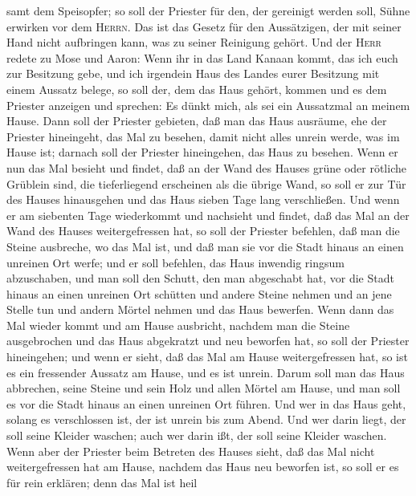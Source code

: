 samt dem Speisopfer; so soll der Priester für den, der gereinigt werden
soll, Sühne erwirken vor dem \textsc{Herrn}.  Das ist das
Gesetz für den Aussätzigen, der mit seiner Hand nicht aufbringen kann,
was zu seiner Reinigung gehört.  Und der \textsc{Herr}
redete zu Mose und Aaron:  Wenn ihr in das Land Kanaan
kommt, das ich euch zur Besitzung gebe, und ich irgendein Haus des
Landes eurer Besitzung mit einem Aussatz belege,  so soll
der, dem das Haus gehört, kommen und es dem Priester anzeigen und
sprechen: Es dünkt mich, als sei ein Aussatzmal an meinem Hause.
 Dann soll der Priester gebieten, daß man das Haus
ausräume, ehe der Priester hineingeht, das Mal zu besehen, damit nicht
alles unrein werde, was im Hause ist; darnach soll der Priester
hineingehen, das Haus zu besehen.  Wenn er nun das Mal
besieht und findet, daß an der Wand des Hauses grüne oder rötliche
Grüblein sind, die tieferliegend erscheinen als die übrige Wand,
 so soll er zur Tür des Hauses hinausgehen und das Haus
sieben Tage lang verschließen.  Und wenn er am siebenten
Tage wiederkommt und nachsieht und findet, daß das Mal an der Wand des
Hauses weitergefressen hat,  so soll der Priester
befehlen, daß man die Steine ausbreche, wo das Mal ist, und daß man sie
vor die Stadt hinaus an einen unreinen Ort werfe;  und er
soll befehlen, das Haus inwendig ringsum abzuschaben, und man soll den
Schutt, den man abgeschabt hat, vor die Stadt hinaus an einen unreinen
Ort schütten  und andere Steine nehmen und an jene Stelle
tun und andern Mörtel nehmen und das Haus bewerfen.  Wenn
dann das Mal wieder kommt und am Hause ausbricht, nachdem man die Steine
ausgebrochen und das Haus abgekratzt und neu beworfen hat,
 so soll der Priester hineingehen; und wenn er sieht, daß
das Mal am Hause weitergefressen hat, so ist es ein fressender Aussatz
am Hause, und es ist unrein.  Darum soll man das Haus
abbrechen, seine Steine und sein Holz und allen Mörtel am Hause, und man
soll es vor die Stadt hinaus an einen unreinen Ort führen.
 Und wer in das Haus geht, solang es verschlossen ist,
der ist unrein bis zum Abend.  Und wer darin liegt, der
soll seine Kleider waschen; auch wer darin ißt, der soll seine Kleider
waschen.  Wenn aber der Priester beim Betreten des Hauses
sieht, daß das Mal nicht weitergefressen hat am Hause, nachdem das Haus
neu beworfen ist, so soll er es für rein erklären; denn das Mal ist heil
